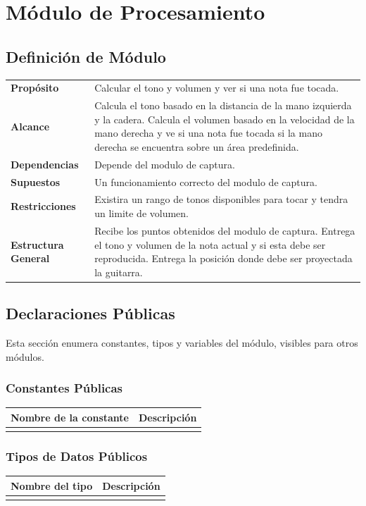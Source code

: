 \documentclass[a4paper,10pt]{article}
\begin{document}
\section{Módulo de Procesamiento}
\label{sec:procesamiento}
\subsection{Definición de Módulo}
\begin{tabularx}{\textwidth}{p{25mm} X}
        \textbf{Propósito} & Calcular el tono y volumen y ver si una nota fue tocada.\\
        \textbf{Alcance} & Calcula el tono basado en la distancia de la mano izquierda y la cadera. Calcula el volumen basado en la velocidad de la mano derecha y ve si una nota fue tocada si la mano derecha se encuentra sobre un área predefinida.\\
        \textbf{Dependencias} & Depende del modulo de captura.\\
        \textbf{Supuestos} & Un funcionamiento correcto del modulo de captura.\\
        \textbf{Restricciones} & Existira un rango de tonos disponibles para tocar y tendra un limite de volumen.\\
        \textbf{Estructura General} & Recibe los puntos obtenidos del modulo de captura. Entrega el tono y volumen de la nota actual y si esta debe ser reproducida. Entrega la posición donde debe ser proyectada la guitarra. \\
\end{tabularx}
\subsection{Declaraciones Públicas}
Esta sección enumera constantes, tipos y variables del módulo, visibles para
otros módulos.
\subsubsection{Constantes Públicas}
\begin{tabular}{| p{30mm} | p{10cm} |}
        \hline
        \textbf{Nombre de la \mbox{constante}} & \textbf{Descripción} \\
        \hline
         & \\
        \hline
\end{tabular}
                

\subsubsection{Tipos de Datos Públicos}
\begin{tabular}{| p{30mm} | p{10cm} |}
        \hline
        \textbf{Nombre del \mbox{tipo}} & \textbf{Descripción} \\
        \hline
         & \\
        \hline
\end{tabular}
\end{document}
